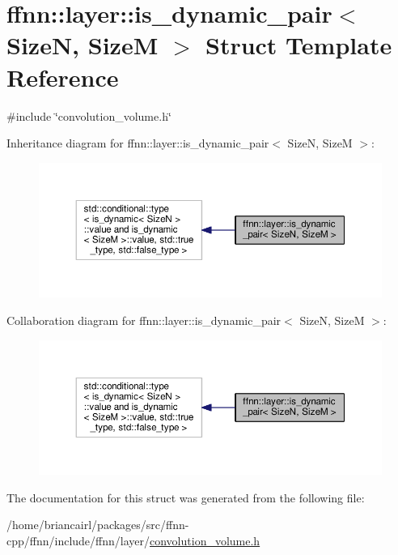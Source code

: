 \hypertarget{structffnn_1_1layer_1_1is__dynamic__pair}{\section{ffnn\-:\-:layer\-:\-:is\-\_\-dynamic\-\_\-pair$<$ Size\-N, Size\-M $>$ Struct Template Reference}
\label{structffnn_1_1layer_1_1is__dynamic__pair}
}


{\ttfamily \#include \char`\"{}convolution\-\_\-volume.\-h\char`\"{}}



Inheritance diagram for ffnn\-:\-:layer\-:\-:is\-\_\-dynamic\-\_\-pair$<$ Size\-N, Size\-M $>$\-:\nopagebreak
\begin{figure}[H]
\begin{center}
\leavevmode
\includegraphics[width=350pt]{structffnn_1_1layer_1_1is__dynamic__pair__inherit__graph}
\end{center}
\end{figure}


Collaboration diagram for ffnn\-:\-:layer\-:\-:is\-\_\-dynamic\-\_\-pair$<$ Size\-N, Size\-M $>$\-:\nopagebreak
\begin{figure}[H]
\begin{center}
\leavevmode
\includegraphics[width=350pt]{structffnn_1_1layer_1_1is__dynamic__pair__coll__graph}
\end{center}
\end{figure}


The documentation for this struct was generated from the following file\-:\begin{DoxyCompactItemize}
\item 
/home/briancairl/packages/src/ffnn-\/cpp/ffnn/include/ffnn/layer/\hyperlink{convolution__volume_8h}{convolution\-\_\-volume.\-h}\end{DoxyCompactItemize}
